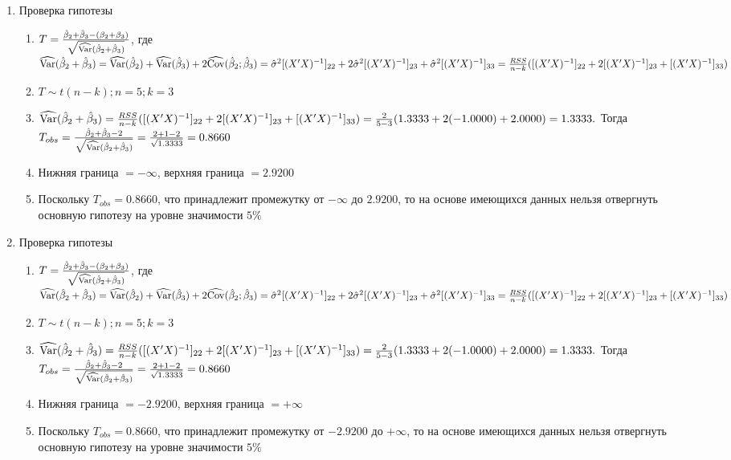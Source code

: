 \begin{problem}
\begin{sol}
\begin{enumerate}
\begin{enumerate}
\end{enumerate}
\item Проверка гипотезы
\begin{enumerate}
\item $T = \frac{\hat{\beta}_2 + \hat{\beta}_3 - (\beta_2 + \beta_3)}{\sqrt{\widehat{\operatorname{Var}}(\hat{\beta}_2 + \hat{\beta}_3)}}$, где $\widehat{\operatorname{Var}}(\hat{\beta}_2 + \hat{\beta}_3) = \widehat{\operatorname{Var}}(\hat{\beta}_2) + \widehat{\operatorname{Var}}(\hat{\beta}_3) + 2\widehat{\operatorname{Cov}}(\hat{\beta}_2;\hat{\beta}_3) = \hat{\sigma}^2 [(X'X)^{-1}]_{22} + 2\hat{\sigma}^2 [(X'X)^{-1}]_{23} + \hat{\sigma}^2 [(X'X)^{-1}]_{33}= \frac{RSS}{n - k}([(X'X)^{-1}]_{22} + 2[(X'X)^{-1}]_{23} + [(X'X)^{-1}]_{33})$
\item $T \sim t(n-k); n = 5; k = 3$
\item $\widehat{\operatorname{Var}}(\hat{\beta}_2 + \hat{\beta}_3) = \frac{RSS}{n - k}([(X'X)^{-1}]_{22} + 2[(X'X)^{-1}]_{23} + [(X'X)^{-1}]_{33}) = \frac{2}{5 - 3} (1.3333 + 2(-1.0000) + 2.0000) = 1.3333.$ Тогда $T_{obs} = \frac{\hat{\beta}_2 + \hat{\beta}_3 - 2}{\sqrt{\widehat{\operatorname{Var}}(\hat{\beta}_2 + \hat{\beta}_3)}} = \frac{2 + 1 - 2}{\sqrt{1.3333}} = 0.8660$
\item Нижняя граница $= - \infty$, верхняя граница $= 2.9200$
\item Поскольку $T_{obs} = 0.8660$, что принадлежит промежутку от $- \infty$ до $2.9200$, то на основе имеющихся данных нельзя отвергнуть основную гипотезу на уровне значимости $5\%$
\end{enumerate}
\item Проверка гипотезы
\begin{enumerate}
\item $T = \frac{\hat{\beta}_2 + \hat{\beta}_3 - (\beta_2 + \beta_3)}{\sqrt{\widehat{\operatorname{Var}}(\hat{\beta}_2 + \hat{\beta}_3)}}$, где $\widehat{\operatorname{Var}}(\hat{\beta}_2 + \hat{\beta}_3) = \widehat{\operatorname{Var}}(\hat{\beta}_2) + \widehat{\operatorname{Var}}(\hat{\beta}_3) + 2\widehat{\operatorname{Cov}}(\hat{\beta}_2;\hat{\beta}_3) = \hat{\sigma}^2 [(X'X)^{-1}]_{22} + 2\hat{\sigma}^2 [(X'X)^{-1}]_{23} + \hat{\sigma}^2 [(X'X)^{-1}]_{33}= \frac{RSS}{n - k}([(X'X)^{-1}]_{22} + 2[(X'X)^{-1}]_{23} + [(X'X)^{-1}]_{33})$
\item $T \sim t(n-k); n = 5; k = 3$
\item $\widehat{\operatorname{Var}}(\hat{\beta}_2 + \hat{\beta}_3) = \frac{RSS}{n - k}([(X'X)^{-1}]_{22} + 2[(X'X)^{-1}]_{23} + [(X'X)^{-1}]_{33}) = \frac{2}{5 - 3} (1.3333 + 2(-1.0000) + 2.0000) = 1.3333.$ Тогда $T_{obs} = \frac{\hat{\beta}_2 + \hat{\beta}_3 - 2}{\sqrt{\widehat{\operatorname{Var}}(\hat{\beta}_2 + \hat{\beta}_3)}} = \frac{2 + 1 - 2}{\sqrt{1.3333}} = 0.8660$
\item Нижняя граница $= - 2.9200$, верхняя граница $= + \infty$
\item Поскольку $T_{obs} = 0.8660$, что принадлежит промежутку от $-  2.9200$ до $+ \infty$, то на основе имеющихся данных нельзя отвергнуть основную гипотезу на уровне значимости $5\%$
\end{enumerate}
\end{enumerate}
\end{sol}
\end{problem}




